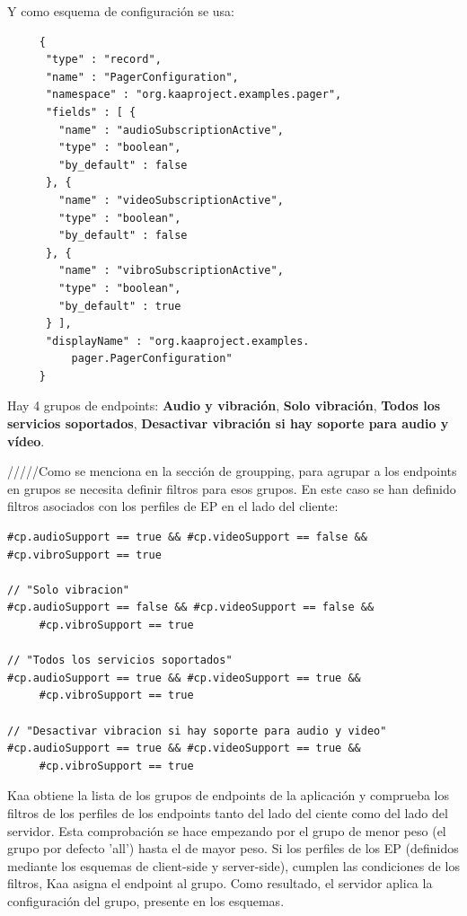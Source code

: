 \documentclass[12pt, twoside]{book}
\begin{document}
Y como esquema de configuración se usa:
\begin{lstlisting}
     {
	  "type" : "record",
	  "name" : "PagerConfiguration",
	  "namespace" : "org.kaaproject.examples.pager",
	  "fields" : [ {
		"name" : "audioSubscriptionActive",
		"type" : "boolean",
		"by_default" : false
	  }, {
		"name" : "videoSubscriptionActive",
		"type" : "boolean",
		"by_default" : false
	  }, {
		"name" : "vibroSubscriptionActive",
		"type" : "boolean",
		"by_default" : true
	  } ],
	  "displayName" : "org.kaaproject.examples.
	      pager.PagerConfiguration"
     }
\end{lstlisting}

Hay 4 grupos de endpoints: \textbf{Audio y vibración}, \textbf{Solo vibración}, \textbf{Todos los servicios soportados}, \textbf{Desactivar vibración si hay soporte para audio y vídeo}. 

/////Como se menciona en la sección de groupping, para agrupar a los endpoints en grupos se necesita definir filtros para esos grupos. En este caso se han definido filtros asociados con los perfiles de EP en el lado del cliente: 
\begin{lstlisting}[frame=shadowbox,basicstyle=\footnotesize , breaklines=true]
% Filtros para el grupo de "Audio y Vibracion"
#cp.audioSupport == true && #cp.videoSupport == false && #cp.vibroSupport == true
		
// "Solo vibracion"
#cp.audioSupport == false && #cp.videoSupport == false &&
     #cp.vibroSupport == true
		
// "Todos los servicios soportados"
#cp.audioSupport == true && #cp.videoSupport == true && 
     #cp.vibroSupport == true
		
// "Desactivar vibracion si hay soporte para audio y video"
#cp.audioSupport == true && #cp.videoSupport == true && 
     #cp.vibroSupport == true
\end{lstlisting}
Kaa obtiene la lista de los grupos de endpoints de la aplicación y comprueba los filtros de los perfiles de los endpoints tanto del lado del ciente como del lado del servidor. Esta comprobación se hace empezando por el grupo de menor peso (el grupo por defecto 'all') hasta el de mayor peso. Si los perfiles de los EP (definidos mediante los esquemas de client-side y server-side), cumplen las condiciones de los filtros, Kaa asigna el endpoint al grupo. Como resultado, el servidor aplica la configuración del grupo, presente en los esquemas. \\
\end{document}
